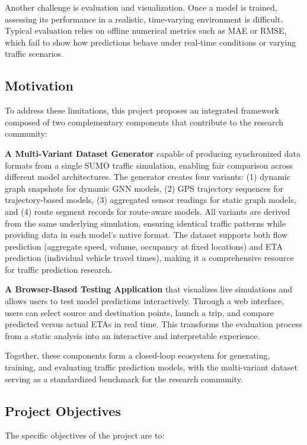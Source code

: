 Another challenge is evaluation and visualization. Once a model is trained, assessing its performance in a realistic, time-varying environment is difficult. Typical evaluation relies on offline numerical metrics such as MAE or RMSE, which fail to show how predictions behave under real-time conditions or varying traffic scenarios.

\subsection{Motivation}

To address these limitations, this project proposes an integrated framework composed of two complementary components that contribute to the research community:

\textbf{A Multi-Variant Dataset Generator} capable of producing synchronized data formats from a single SUMO traffic simulation, enabling fair comparison across different model architectures. The generator creates four variants: (1) dynamic graph snapshots for dynamic GNN models, (2) GPS trajectory sequences for trajectory-based models, (3) aggregated sensor readings for static graph models, and (4) route segment records for route-aware models. All variants are derived from the same underlying simulation, ensuring identical traffic patterns while providing data in each model's native format. The dataset supports both flow prediction (aggregate speed, volume, occupancy at fixed locations) and ETA prediction (individual vehicle travel times), making it a comprehensive resource for traffic prediction research.

\textbf{A Browser-Based Testing Application} that visualizes live simulations and allows users to test model predictions interactively. Through a web interface, users can select source and destination points, launch a trip, and compare predicted versus actual ETAs in real time. This transforms the evaluation process from a static analysis into an interactive and interpretable experience.

Together, these components form a closed-loop ecosystem for generating, training, and evaluating traffic prediction models, with the multi-variant dataset serving as a standardized benchmark for the research community.

\subsection{Project Objectives}

The specific objectives of the project are to:

